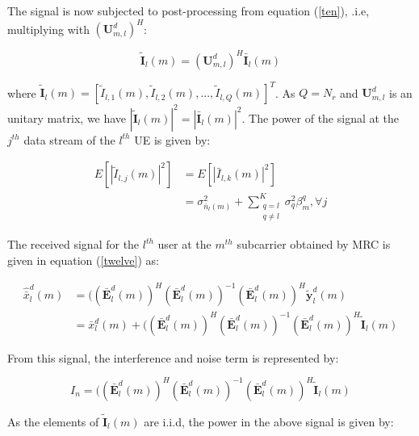 \documentclass[conference]{IEEEtran}
\begin{document}
The signal is now subjected to post-processing from equation (\ref{ten}), .i.e, multiplying with $(\mathbf{U}^d_{m,l})^H$:

\begin{equation}
\label{twenty_one}
  \mathbf{\tilde{I}}_l(m) = (\mathbf{U}^d_{m,l})^H \mathbf{\bar{I}}_l(m)
\end{equation}
   
where $\mathbf{\tilde{I}}_l(m)=[{\tilde{I}}_{l,1}(m), {\tilde{I}}_{l,2}(m), ...,{\tilde{I}}_{l,Q}(m)]^T$. As $Q=N_r$ and $\mathbf{U}^d_{m,l}$ is an unitary matrix, we have $|\mathbf{\tilde{I}}_l(m)|^2 = |\mathbf{\bar{I}}_l(m)|^2$. The power of the signal at the $j^{th}$ data stream of the $l^{th}$ UE is given by:

\begin{equation}
\label{twenty_two}
\begin{split}
E[|\tilde{I}_{l,j}(m)|^2] &= E[|\bar{I}_{l,k}(m)|^2] \\ 
&= \sigma^2_{\bar{n}_{l}(m)} + \sum_{\substack{ q=l \\ q \neq l}}^{K} \sigma_q^2 \beta^q_m, \forall j
\end{split}
     \end{equation}
     
The received signal for the $l^{th}$ user at the $m^{th}$ subcarrier obtained by MRC is given in equation (\ref{twelve}) as:
   
   \begin{equation}
       \label{twenty_three}
       \begin{split}
      \hat{\bar{x}}^d_l(m) &=((\mathbf{\bar{E}}^d_l(m))^H (\mathbf{\bar{E}}^d_l(m))^{-1} (\mathbf{\bar{E}}^d_l(m))^H \mathbf{\tilde{y}}^d_l(m) \\
        &= \bar{x}_l^d(m) + ((\mathbf{\bar{E}}^d_l(m))^H (\mathbf{\bar{E}}^d_l(m))^{-1} (\mathbf{\bar{E}}^d_l(m))^H \mathbf{\tilde{I}}_l(m)
        \end{split}
       \end{equation} 
       
From this signal, the interference and noise term is represented by:

\begin{equation}
\label{twenty_four}
  I_n = ((\mathbf{\bar{E}}^d_l(m))^H (\mathbf{\bar{E}}^d_l(m))^{-1} (\mathbf{\bar{E}}^d_l(m))^H \mathbf{\tilde{I}}_l(m)
\end{equation}

As the elements of $\mathbf{\tilde{I}}_l(m)$ are i.i.d, the power in the above signal is given by:
\end{document}
